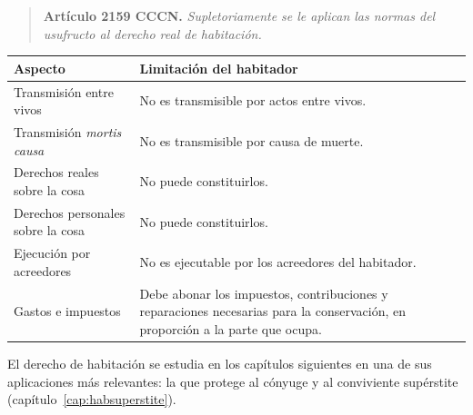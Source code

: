 \documentclass[12pt,oneside]{book}
\begin{document}
\begin{quote}
\textbf{Artículo 2159 CCCN.} \textit{Supletoriamente se le aplican las normas del usufructo al derecho real de habitación.}
\end{quote}

\begin{table}[H]
\centering
\begin{tabularx}{\textwidth}{>{\raggedright\arraybackslash}p{}>{\raggedright\arraybackslash}X}
\toprule
\textbf{Aspecto} & \textbf{Limitación del habitador} \\
\midrule
Transmisión entre vivos & No es transmisible por actos entre vivos. \\
Transmisión \textit{mortis causa} & No es transmisible por causa de muerte. \\
Derechos reales sobre la cosa & No puede constituirlos. \\
Derechos personales sobre la cosa & No puede constituirlos. \\
Ejecución por acreedores & No es ejecutable por los acreedores del habitador. \\
Gastos e impuestos & Debe abonar los impuestos, contribuciones y reparaciones necesarias para la conservación, en proporción a la parte que ocupa. \\
\bottomrule
\end{tabularx}
\end{table}

El derecho de habitación se estudia en los capítulos siguientes en una de sus aplicaciones más relevantes: la que protege al cónyuge y al conviviente supérstite (capítulo~\ref{cap:habsuperstite}).
\end{document}

